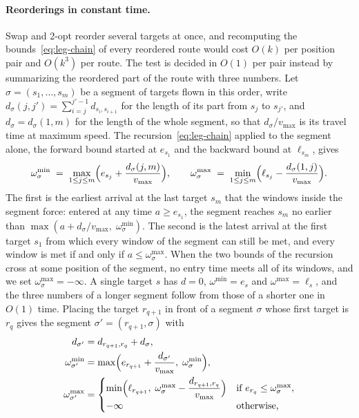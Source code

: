 \documentclass[11pt]{article}
\begin{document}
\paragraph{Reorderings in constant time.}
Swap and 2-opt reorder several targets at once, and recomputing the bounds~\eqref{eq:leg-chain} of every reordered route would cost $O(k)$ per position pair and $O(k^3)$ per route. The test is decided in $O(1)$ per pair instead by summarizing the reordered part of the route with three numbers. Let $\sigma = (s_1, \ldots, s_m)$ be a segment of targets flown in this order, write $d_\sigma(j, j') = \sum_{i = j}^{j' - 1} d_{s_i, s_{i+1}}$ for the length of its part from $s_j$ to $s_{j'}$, and $d_\sigma = d_\sigma(1, m)$ for the length of the whole segment, so that $d_\sigma / v_{\max}$ is its travel time at maximum speed. The recursion~\eqref{eq:leg-chain} applied to the segment alone, the forward bound started at $e_{s_1}$ and the backward bound at $\ell_{s_m}$, gives
\begin{equation}\label{eq:seg-summary}
    \omega^{\min}_\sigma \;=\; \max_{1 \le j \le m} \Bigl( e_{s_j} + \frac{d_\sigma(j, m)}{v_{\max}} \Bigr),
    \qquad
    \omega^{\max}_\sigma \;=\; \min_{1 \le j \le m} \Bigl( \ell_{s_j} - \frac{d_\sigma(1, j)}{v_{\max}} \Bigr).
\end{equation}
The first is the earliest arrival at the last target $s_m$ that the windows inside the segment force: entered at any time $a \ge e_{s_1}$, the segment reaches $s_m$ no earlier than $\max(a + d_\sigma / v_{\max},\; \omega^{\min}_\sigma)$. The second is the latest arrival at the first target $s_1$ from which every window of the segment can still be met, and every window is met if and only if $a \le \omega^{\max}_\sigma$. When the two bounds of the recursion cross at some position of the segment, no entry time meets all of its windows, and we set $\omega^{\max}_\sigma = -\infty$. A single target $s$ has $d = 0$, $\omega^{\min} = e_s$ and $\omega^{\max} = \ell_s$, and the three numbers of a longer segment follow from those of a shorter one in $O(1)$ time. Placing the target $r_{q+1}$ in front of a segment $\sigma$ whose first target is $r_q$ gives the segment $\sigma' = (r_{q+1}, \sigma)$ with
\begin{equation}\label{eq:seg-prepend}
\begin{aligned}
    d_{\sigma'} &= d_{r_{q+1}, r_q} + d_\sigma, \\
    \omega^{\min}_{\sigma'} &= \max\Bigl( e_{r_{q+1}} + \frac{d_{\sigma'}}{v_{\max}},\; \omega^{\min}_\sigma \Bigr), \\
    \omega^{\max}_{\sigma'} &= \begin{cases} \min\Bigl( \ell_{r_{q+1}},\; \omega^{\max}_\sigma - \dfrac{d_{r_{q+1}, r_q}}{v_{\max}} \Bigr) & \text{if } e_{r_q} \le \omega^{\max}_\sigma, \\[4pt] -\infty & \text{otherwise,} \end{cases}
\end{aligned}
\end{equation}
\end{document}
